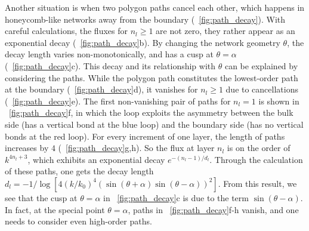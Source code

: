 \documentclass[
 preprint,
 preprintnumbers,
 amsmath,amssymb,
 aps,
 pre,
 longbibliography,
 10pt, twocolumn
]{revtex4-1}
\begin{document}
Another situation is when two polygon paths cancel each other, which happens in honeycomb-like networks away from the boundary (\figurename~\ref{fig:path_decay}). 
With careful calculations, the fluxes for $n_l\ge 1$ are not zero, they rather appear as an exponential decay (\figurename~\ref{fig:path_decay}b). By changing the network geometry $\theta$, the decay length varies non-monotonically, and has a cusp at $\theta=\alpha$ (\figurename~\ref{fig:path_decay}c). 
This decay and its relationship with $\theta$ can be explained by considering the paths.
While the polygon path constitutes the lowest-order path at the boundary (\figurename~\ref{fig:path_decay}d), it vanishes for $n_l\ge 1$ due to cancellations (\figurename~\ref{fig:path_decay}e). The first non-vanishing pair of paths for $n_l=1$ is shown in \figurename~\ref{fig:path_decay}f, in which the loop exploits the asymmetry between the bulk side (has a vertical bond at the blue loop) and the boundary side (has no vertical bonds at the red loop). For every increment of one layer, the length of paths increases by $4$ (\figurename~\ref{fig:path_decay}g,h). So the flux at layer $n_l$ is on the order of $k^{4n_l+3}$, which exhibits an exponential decay $e^{-(n_l-1)/d_l}$. 
Through the calculation of these paths, one gets the decay length $d_l = -1/\log[4(k/k_0)^4(\sin(\theta+\alpha)\sin(\theta-\alpha))^2]$. From this result, we see that the cusp at $\theta=\alpha$ in \figurename~\ref{fig:path_decay}c is due to the term $\sin(\theta-\alpha)$. In fact, at the special point $\theta=\alpha$, paths in \figurename~\ref{fig:path_decay}f-h vanish, and one needs to consider even high-order paths.
\end{document}
